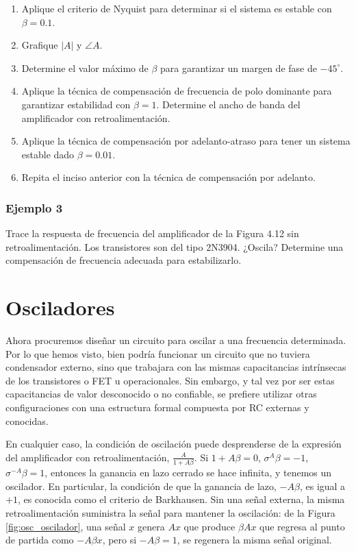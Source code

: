 \begin{enumerate}
	\item[a)] Aplique el criterio de Nyquist para determinar si el sistema es estable con \(\beta = 0.1\).
	\item[b)] Grafique \(|A|\) y \(\angle A\).
	\item[c)] Determine el valor máximo de \(\beta\) para garantizar un margen de fase de \(-45^\circ\).
	\item[d)] Aplique la técnica de compensación de frecuencia de polo dominante para garantizar estabilidad con \(\beta = 1\). Determine el ancho de banda del amplificador con retroalimentación.
	\item[e)] Aplique la técnica de compensación por adelanto-atraso para tener un sistema estable dado \(\beta = 0.01\).
	\item[f)] Repita el inciso anterior con la técnica de compensación por adelanto.
\end{enumerate}

\subsubsection{Ejemplo 3}

Trace la respuesta de frecuencia del amplificador de la Figura 4.12 sin retroalimentación. Los transistores son del tipo 2N3904. ¿Oscila? Determine una compensación de frecuencia adecuada para estabilizarlo.

\section{Osciladores} %

Ahora procuremos diseñar un circuito para oscilar a una frecuencia determinada. Por lo que hemos visto, bien podría funcionar un circuito que no tuviera condensador externo, sino que trabajara con las mismas capacitancias intrínsecas de los transistores o FET u operacionales. Sin embargo, y tal vez por ser estas capacitancias de valor desconocido o no confiable, se prefiere utilizar otras configuraciones con una estructura formal compuesta por RC externas y conocidas.

En cualquier caso, la condición de oscilación puede desprenderse de la expresión del amplificador con retroalimentación, $\frac{A}{1+A\beta}$. Si $1+A\beta = 0$, $\sigma^A\beta = -1$, $\sigma^{-A}\beta = 1$, entonces la ganancia en lazo cerrado se hace infinita, y tenemos un oscilador. En particular, la condición de que la ganancia de lazo, $-A\beta$, es igual a $+1$, es conocida como el criterio de Barkhausen. Sin una señal externa, la misma retroalimentación suministra la señal para mantener la oscilación: de la Figura \ref{fig:osc_oscilador}, una señal $x$ genera $Ax$ que produce $\beta Ax$ que regresa al punto de partida como $-A\beta x$, pero si $-A\beta = 1$, se regenera la misma señal original.

